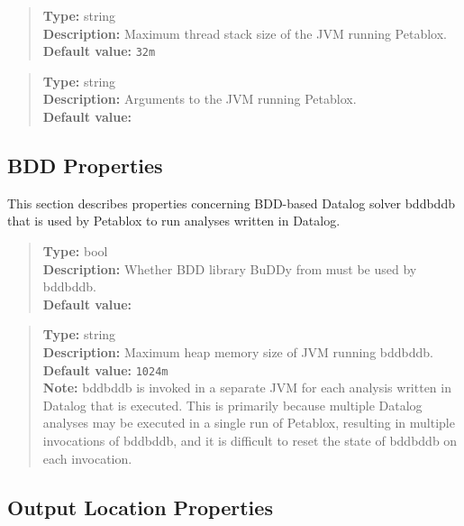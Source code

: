 \begin{quote}
{\bf Type:} string \\
{\bf Description:} Maximum thread stack size of the JVM running Petablox. \\
{\bf Default value:} {\tt 32m}
\end{quote}

\begin{quote}
{\bf Type:} string \\
{\bf Description:} Arguments to the JVM running Petablox. \\
{\bf Default value:}    
\end{quote}

\subsection{BDD Properties}
\label{sec:bdd-props}

This section describes properties concerning BDD-based Datalog solver bddbddb that is used by Petablox to run analyses written in Datalog.

\begin{quote}
{\bf Type:} bool \\
{\bf Description:} Whether BDD library BuDDy from  must be used by bddbddb. \\
{\bf Default value:} 
\end{quote}

\begin{quote}
{\bf Type:} string \\
{\bf Description:} Maximum heap memory size of JVM running bddbddb. \\
{\bf Default value:} {\tt 1024m} \\
{\bf Note:} bddbddb is invoked in a separate JVM for each analysis written in Datalog that is executed.
This is primarily because multiple Datalog analyses may be executed in a single run of Petablox,
resulting in multiple invocations of bddbddb, and it is difficult to reset the state of bddbddb on each invocation. 
\end{quote}

\subsection{Output Location Properties}
\label{sec:output-props}

